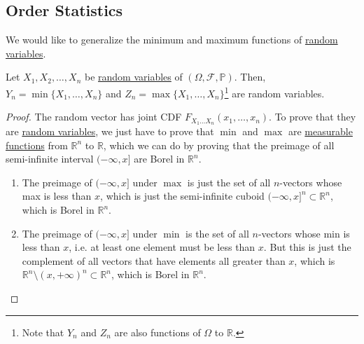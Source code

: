 \subsection{Order Statistics}

	We would like to generalize the minimum and maximum functions of \hyperref[def:random-variable]{random variables}. 

	\begin{definition}
	  \label{def:minimum-maximum-of-random-variables}
		Let $X_1, X_2, \ldots, X_n$ be \hyperref[def:random-variable]{random variables} of $(\Omega, \mathcal{F}, \mathbb{P})$. Then, $Y_n = \min\{X_1, \ldots, X_n\}$ and $Z_n = \max\{X_1, \ldots, X_n\}$\footnote{Note that $Y_n$ and $Z_n$ are also functions of $\Omega$ to $\mathbb{R}$.} are random variables. 
	\end{definition}
	\begin{proof}
		The random vector has joint CDF $F_{X_1 \ldots X_n} (x_1, \ldots, x_n)$. To prove that they are \hyperref[def:random-variable]{random variables}, we just have to prove that $\min$ and $\max$ are \hyperref[mt-def:measurable-function]{measurable functions} from $\mathbb{R}^n$ to $\mathbb{R}$, which we can do by proving that the preimage of all semi-infinite interval $(-\infty, x]$ are Borel in $\mathbb{R}^n$. 
		\begin{enumerate}
			\item The preimage of $(-\infty, x]$ under $\max$ is just the set of all $n$-vectors whose max is less than $x$, which is just the semi-infinite cuboid $(-\infty, x]^n \subset \mathbb{R}^n$, which is Borel in $\mathbb{R}^n$. 
			\item The preimage of $(-\infty, x]$ under $\min$ is the set of all $n$-vectors whose min is less than $x$, i.e. at least one element must be less than $x$. But this is just the complement of all vectors that have elements all greater than $x$, which is $\mathbb{R}^n \setminus (x, +\infty)^n \subset \mathbb{R}^n$, which is Borel in $\mathbb{R}^n$. 
		\end{enumerate}
	\end{proof}

